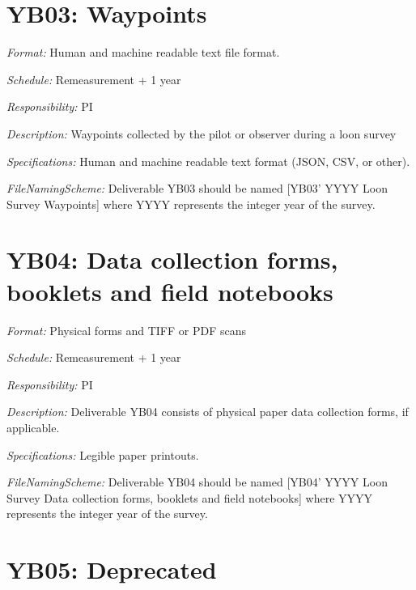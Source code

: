 \documentclass[
  letterpaper,
  DIV=11,
  numbers=noendperiod]{scrreprt}
\begin{document}

\chapter*{YB03: Waypoints}\label{yb03-waypoints}


\emph{Format:} Human and machine readable text file format.

\emph{Schedule:} Remeasurement + 1 year

\emph{Responsibility:} PI

\emph{Description:} Waypoints collected by the pilot or observer during
a loon survey

\emph{Specifications:} Human and machine readable text format (JSON,
CSV, or other).

\emph{FileNamingScheme:} Deliverable YB03 should be named {[}YB03' YYYY
Loon Survey Waypoints{]} where YYYY represents the integer year of the
survey.


\chapter*{YB04: Data collection forms, booklets and field
notebooks}\label{yb04-data-collection-forms-booklets-and-field-notebooks}


\emph{Format:} Physical forms and TIFF or PDF scans

\emph{Schedule:} Remeasurement + 1 year

\emph{Responsibility:} PI

\emph{Description:} Deliverable YB04 consists of physical paper data
collection forms, if applicable.

\emph{Specifications:} Legible paper printouts.

\emph{FileNamingScheme:} Deliverable YB04 should be named {[}YB04' YYYY
Loon Survey Data collection forms, booklets and field notebooks{]} where
YYYY represents the integer year of the survey.


\chapter*{YB05: Deprecated}\label{yb05-deprecated}
\end{document}
